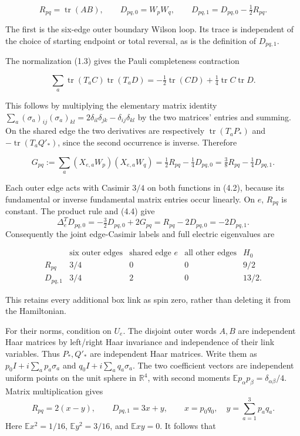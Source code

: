 \documentclass[
  11pt,
]{article}
\begin{document}
\[
R_{pq}=\operatorname{tr}(AB),\qquad
D_{pq,0}=W_pW_q,\qquad
D_{pq,1}=D_{pq,0}-\tfrac12R_{pq}.
\tag{4.2}
\]

The first is the six-edge outer boundary Wilson loop. Its trace is
independent of the choice of starting endpoint or total reversal, as is
the definition of \(D_{pq,1}\).

The normalization (1.3) gives the Pauli completeness contraction

\[
\sum_a\operatorname{tr}(T_aC)\operatorname{tr}(T_aD)
=-\tfrac12\operatorname{tr}(CD)+\tfrac14\operatorname{tr}C\operatorname{tr}D.
\tag{4.3}
\]

This follows by multiplying the elementary matrix identity
\(\sum_a(\sigma_a)_{ij}(\sigma_a)_{kl}
=2\delta_{il}\delta_{jk}-\delta_{ij}\delta_{kl}\) by the two matrices'
entries and summing. On the shared edge the two derivatives are
respectively \(\operatorname{tr}(T_aP_*)\) and
\(-\operatorname{tr}(T_aQ'_*)\), since the second occurrence is inverse.
Therefore

\[
G_{pq}:=\sum_a(X_{e,a}W_p)(X_{e,a}W_q)
=\tfrac12R_{pq}-\tfrac14D_{pq,0}
=\tfrac38R_{pq}-\tfrac14D_{pq,1}.
\tag{4.4}
\]

Each outer edge acts with Casimir \(3/4\) on both functions in (4.2),
because its fundamental or inverse fundamental matrix entries occur
linearly. On \(e\), \(R_{pq}\) is constant. The product rule and (4.4)
give \[
\Delta_e^TD_{pq,0}=-\tfrac32D_{pq,0}+2G_{pq}
=R_{pq}-2D_{pq,0}=-2D_{pq,1}.
\] Consequently the joint edge-Casimir labels and full electric
eigenvalues are

\[
\begin{array}{c|ccc|c}
 &\text{six outer edges}&\text{shared edge }e&\text{all other edges}&H_0\\ \hline
R_{pq}&3/4&0&0&9/2\\
D_{pq,1}&3/4&2&0&13/2.
\end{array}
\tag{4.5}
\]

This retains every additional box link as spin zero, rather than
deleting it from the Hamiltonian.

For their norms, condition on \(U_e\). The disjoint outer words \(A,B\)
are independent Haar matrices by left/right Haar invariance and
independence of their link variables. Thus \(P_*,Q'_*\) are independent
Haar matrices. Write them as \(p_0I+i\sum_ap_a\sigma_a\) and
\(q_0I+i\sum_aq_a\sigma_a\). The two coefficient vectors are independent
uniform points on the unit sphere in \(\mathbb R^4\), with second
moments \(\mathbb E p_\alpha p_\beta=\delta_{\alpha\beta}/4\). Matrix
multiplication gives \[
R_{pq}=2(x-y),\qquad D_{pq,1}=3x+y,\qquad
x=p_0q_0,\quad y=\sum_{a=1}^3p_aq_a.
\] Here \(\mathbb E x^2=1/16\), \(\mathbb E y^2=3/16\), and
\(\mathbb E xy=0\). It follows that
\end{document}

